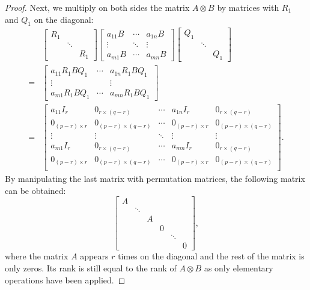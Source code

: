 \documentclass[11pt]{article}
\newcommand{\kp}{\otimes} %
\begin{document}
\begin{proof}
Next, we multiply on both sides the matrix $A\kp B$ by matrices with $R_1$ and $Q_1$ on the diagonal:
\begin{align*}
    &\begin{bmatrix}
    R_1 & &\\
    & \ddots & \\
    & & R_1
    \end{bmatrix}
    \begin{bmatrix}
    a_{11}B & \cdots & a_{1n}B\\
    \vdots & \ddots & \vdots\\
    a_{m1}B & \cdots & a_{mn}B
    \end{bmatrix}
    \begin{bmatrix}
    Q_1 & &\\
    & \ddots & \\
    & & Q_1
    \end{bmatrix}\\
    = &\begin{bmatrix}
    a_{11}R_1BQ_1 & \cdots & a_{1n}R_1BQ_1\\
    \vdots & & \vdots\\
    a_{m1}R_1BQ_1 & \cdots & a_{mn}R_1BQ_1
    \end{bmatrix}\\
    = &\begin{bmatrix}
    a_{11}I_r & 0_{r \times (q - r)} & \cdots & a_{1n}I_r & 0_{r \times (q-r)}\\
    0_{(p-r) \times r} & 0_{(p-r) \times (q-r)} & \cdots & 0_{(p-r) \times r} & 0_{(p-r) \times (q-r)}\\
    \vdots & \vdots & \ddots & \vdots & \vdots\\
    a_{m1}I_r & 0_{r \times (q - r)} & \cdots & a_{mn}I_r & 0_{r \times (q - r)}\\
    0_{(p-r) \times r} & 0_{(p-r) \times (q-r)}& \cdots & 0_{(p-r) \times r} & 0_{(p-r) \times (q-r)}\\
    \end{bmatrix}.
\end{align*}
By manipulating the last matrix with permutation matrices, the following matrix can be obtained:
\[
    \begin{bmatrix}
    A & & & & &\\
    & \ddots & & & &\\
    & & A & & & \\
    & & & 0 & &\\
    & & & & \ddots &\\
    & & & & & 0
    \end{bmatrix},
\]
where the matrix \(A\) appears \(r\) times on the diagonal and the rest of the matrix is only zeros. 
Its rank is still equal to the rank of $A\kp B$ as only elementary operations have been applied.


\end{proof}
\end{document}
